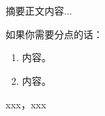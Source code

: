 \chapter*{}
摘要正文内容...

如果你需要分点的话：


\begin{enumerate}[~(1)]
	\item {}内容。
	
	\item {}内容。
\end{enumerate} 


{} xxx，xxx

